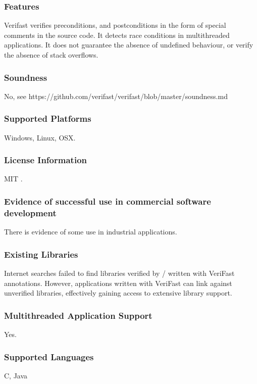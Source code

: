 \documentclass[11pt]{article}
\begin{document}
	\subsubsection{Features}
	Verifast verifies preconditions, and postconditions in the form of special comments in the source code.
	It detects race conditions in multithreaded applications. It does not guarantee the absence of undefined behaviour, or verify the absence of stack overflows.	
	
	\subsubsection{Soundness}
	No, see https://github.com/verifast/verifast/blob/master/soundness.md
	\subsubsection{Supported Platforms}
	Windows, Linux, OSX.

	\subsubsection{License Information} 
	MIT \cite {verifastlicense}.
	\subsubsection{Evidence of successful use in commercial software development}
	There is evidence of some use in industrial applications\cite{PhilippaertsPieter2014SvwV}.
	\subsubsection{Existing Libraries}
		Internet searches failed to find libraries verified by / written with VeriFast annotations. However, applications written with VeriFast can link against unverified libraries, effectively gaining access to extensive library support.
	\subsubsection{Multithreaded Application Support}
	Yes.
	\subsubsection{Supported Languages}
	C, Java
\end{document}
